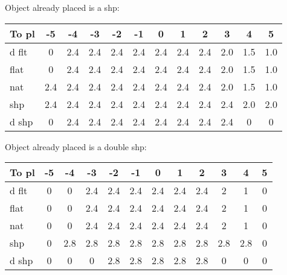 Object already placed is a shp:

{\small\begin{tabular}{|l|c|c|c|c|c|c|c|c|c|c|c|}
\hline
 To pl &  -5 &  -4 &  -3 &  -2 &  -1 &   0 &   1 &   2 &   3 &   4 &   5\\
\hline
 d flt &    0 &2.4 &2.4 &2.4 &2.4 &2.4 &2.4 &2.4 &2.0 &1.5 &1.0\\
\hline
  flat &    0 &2.4 &2.4 &2.4 &2.4 &2.4 &2.4 &2.4 &2.0 &1.5 &1.0\\
\hline
   nat &  2.4 &2.4 &2.4 &2.4 &2.4 &2.4 &2.4 &2.4 &2.0 &1.5 &1.0\\
\hline
   shp &  2.4 &2.4 &2.4 &2.4 &2.4 &2.4 &2.4 &2.4 &2.4 &2.0 &2.0\\
\hline
 d shp &    0 &2.4 &2.4 &2.4 &2.4 &2.4 &2.4 &2.4 &2.4 &  0 &  0\\
\hline
\end{tabular}}

Object already placed is a double shp:

{\small\begin{tabular}{|l|c|c|c|c|c|c|c|c|c|c|c|}
\hline
 To pl &  -5 &  -4 &  -3 &  -2 &  -1 &   0 &   1 &   2 &   3 &   4 &   5\\
\hline
 d flt &    0 &  0 &2.4 &2.4 &2.4 &2.4 &2.4 &2.4 &  2 &  1 &  0\\
\hline
  flat &    0 &  0 &2.4 &2.4 &2.4 &2.4 &2.4 &2.4 &  2 &  1 &  0\\
\hline
   nat &    0 &  0 &2.4 &2.4 &2.4 &2.4 &2.4 &2.4 &  2 &  1 &  0\\
\hline
   shp &    0 &2.8 &2.8 &2.8 &2.8 &2.8 &2.8 &2.8 &2.8 &2.8 &  0\\
\hline
 d shp &    0 &  0 &  0 &2.8 &2.8 &2.8 &2.8 &2.8 &  0 &  0 &  0\\
\hline
\end{tabular}}
